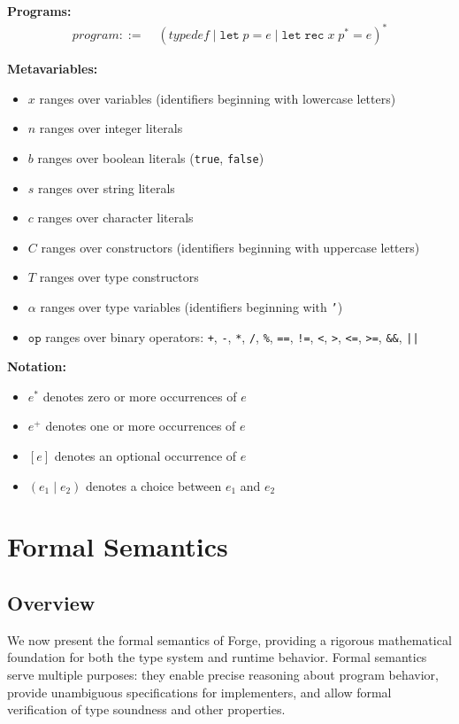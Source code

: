\documentclass[conference,onecolumn]{IEEEtran}
\begin{document}
\textbf{Programs:}
\begin{align*}
\textit{program} ::= &\; (\textit{typedef} \mid \texttt{let} \; p \; \texttt{=} \; e \mid \texttt{let} \; \texttt{rec} \; x \; p^* \; \texttt{=} \; e)^*
\end{align*}

\textbf{Metavariables:}
\begin{itemize}
\item $x$ ranges over variables (identifiers beginning with lowercase letters)
\item $n$ ranges over integer literals
\item $b$ ranges over boolean literals (\texttt{true}, \texttt{false})
\item $s$ ranges over string literals
\item $c$ ranges over character literals
\item $C$ ranges over constructors (identifiers beginning with uppercase letters)
\item $T$ ranges over type constructors
\item $\alpha$ ranges over type variables (identifiers beginning with \texttt{'})
\item $\texttt{op}$ ranges over binary operators: \texttt{+}, \texttt{-}, \texttt{*}, \texttt{/}, \texttt{\%}, \texttt{==}, \texttt{!=}, \texttt{<}, \texttt{>}, \texttt{<=}, \texttt{>=}, \texttt{\&\&}, \texttt{||}
\end{itemize}

\textbf{Notation:}
\begin{itemize}
\item $e^*$ denotes zero or more occurrences of $e$
\item $e^+$ denotes one or more occurrences of $e$
\item $[e]$ denotes an optional occurrence of $e$
\item $(e_1 \mid e_2)$ denotes a choice between $e_1$ and $e_2$
\end{itemize}

\newpage
\section{Formal Semantics}

\subsection{Overview}

We now present the formal semantics of Forge, providing a rigorous mathematical foundation for both the type system and runtime behavior. Formal semantics serve multiple purposes: they enable precise reasoning about program behavior, provide unambiguous specifications for implementers, and allow formal verification of type soundness and other properties.
\end{document}

